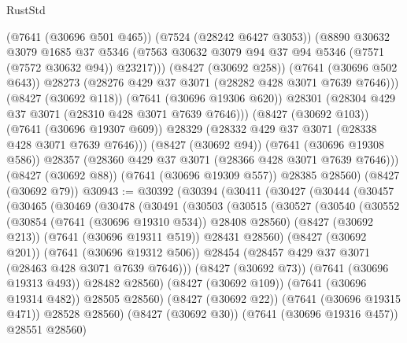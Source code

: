 \begin{lexlean}{RustStd}
\begin{coremodule}
{\begin{coremodule}
{{{{{{{{{{{{{{{{{{{{{{{{{{{{{{{{                (@7641 (@30696 @501 @465))
                (@7524 (@28242 @6427 @3053))
                (@8890
                  @30632
                  @3079
                  @1685
                  @37
                  @5346
                  (@7563 @30632 @3079 @94 @37 @94 @5346 (@7571 (@7572 @30632 @94)) @23217)))
              (@8427 (@30692 @258))
              (@7641 (@30696 @502 @643))
              @28273
              (@28276 @429 @37 @3071 (@28282 @428 @3071 @7639 @7646)))
            (@8427 (@30692 @118))
            (@7641 (@30696 @19306 @620))
            @28301
            (@28304 @429 @37 @3071 (@28310 @428 @3071 @7639 @7646)))
          (@8427 (@30692 @103))
          (@7641 (@30696 @19307 @609))
          @28329
          (@28332 @429 @37 @3071 (@28338 @428 @3071 @7639 @7646)))
        (@8427 (@30692 @94))
        (@7641 (@30696 @19308 @586))
        @28357
        (@28360 @429 @37 @3071 (@28366 @428 @3071 @7639 @7646)))
      (@8427 (@30692 @88))
      (@7641 (@30696 @19309 @557))
      @28385
      @28560)
    (@8427 (@30692 @79))
@30943 := @30392
    (@30394
      (@30411
        (@30427
          (@30444
            (@30457
              (@30465
                (@30469
                  (@30478
                    (@30491
                      (@30503
                        (@30515
                          (@30527
                            (@30540
                              (@30552
                                (@30854 (@7641 (@30696 @19310 @534)) @28408 @28560)
                                (@8427 (@30692 @213))
                                (@7641 (@30696 @19311 @519))
                                @28431
                                @28560)
                              (@8427 (@30692 @201))
                              (@7641 (@30696 @19312 @506))
                              @28454
                              (@28457 @429 @37 @3071 (@28463 @428 @3071 @7639 @7646)))
                            (@8427 (@30692 @73))
                            (@7641 (@30696 @19313 @493))
                            @28482
                            @28560)
                          (@8427 (@30692 @109))
                          (@7641 (@30696 @19314 @482))
                          @28505
                          @28560)
                        (@8427 (@30692 @22))
                        (@7641 (@30696 @19315 @471))
                        @28528
                        @28560)
                      (@8427 (@30692 @30))
                      (@7641 (@30696 @19316 @457))
                      @28551
                      @28560)
}}}}}}}}}}}}}}}}}}}}}}}}}}}}}}}}
\end{coremodule}}
\end{coremodule}
\end{lexlean}
